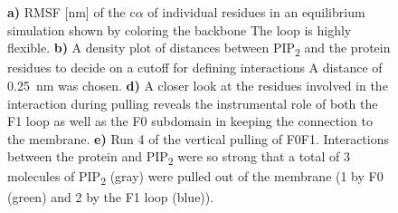 \documentclass[
  twocolumn]{biophys-new-mod}
\begin{document}
\begin{figure}
\begin{minipage}[t]{0.50\linewidth}
{{}

}

\subcaption{\label{fig-f0f1-vert-pull-residues}~}
\end{minipage}%
\newline
\begin{minipage}[t]{\linewidth}

{\centering 


}

\subcaption{\label{fig-f0f1-vert-pull-run4}~}
\end{minipage}%

\caption{\label{fig-suppl}\textbf{a)} RMSF {[}nm{]} of the c\(\alpha\)
of individual residues in an equilibrium simulation shown by coloring
the backbone The loop is highly flexible. \textbf{b)} A density plot of
distances between PIP\textsubscript{2} and the protein residues to
decide on a cutoff for defining interactions A distance of 0.25~nm was
chosen. \textbf{d)} A closer look at the residues involved in the
interaction during pulling reveals the instrumental role of both the F1
loop as well as the F0 subdomain in keeping the connection to the
membrane. \textbf{e)} Run 4 of the vertical pulling of F0F1.
Interactions between the protein and PIP\textsubscript{2} were so strong
that a total of 3 molecules of PIP\textsubscript{2} (gray) were pulled
out of the membrane (1 by F0 (green) and 2 by the F1 loop (blue)).}

\end{figure}
\end{document}
